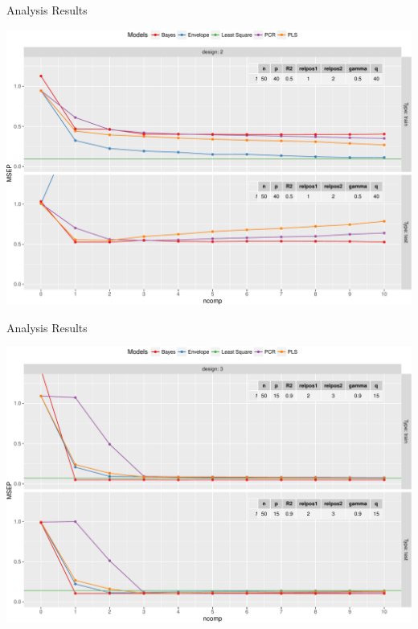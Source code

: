 \documentclass[ignorenonframetext,]{beamer}
\begin{document}
\begin{frame}{Analysis Results}

\includegraphics{Main_files/figure-beamer/unnamed-chunk-7-1.pdf}

\end{frame}

\begin{frame}{Analysis Results}

\includegraphics{Main_files/figure-beamer/unnamed-chunk-8-1.pdf}

\end{frame}
\end{document}
